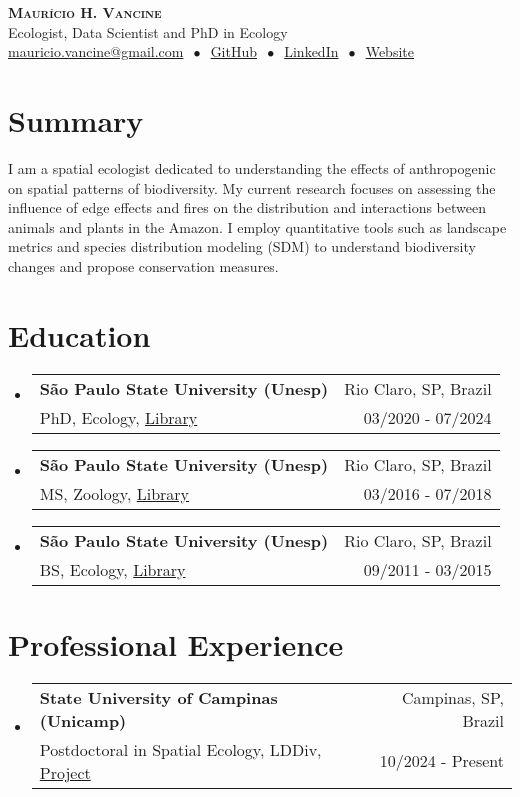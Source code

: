 \documentclass[letterpaper,11pt]{article}
\makeatletter
\newcommand{\cvheading}[4]{
  \vspace{-2pt}\item
    \begin{tabular*}{\textwidth}[t]{l@{\extracolsep{\fill}}r}
      \textbf{#1} & #2 \\
      \small#3 & \small #4 \\
    \end{tabular*}\vspace{-7pt}
}
\newcommand{\cvheadingstart}{\begin{itemize}[leftmargin=0in, label={}]}
\newcommand{\cvheadingend}{\end{itemize}}
\makeatother
\begin{document}
\begin{center}
  \textbf{\LARGE\scshape Maurício H. Vancine} \\
  \vspace{5pt}\small
  Ecologist, Data Scientist and PhD in Ecology\\
  \href{mailto:}{mauricio.vancine@gmail.com}
  $\ \bullet\ $ 
  \href{https://github.com/mauriciovancine}{GitHub}
  $\ \bullet\ $
  \href{https://www.linkedin.com/in/mauricio-vancine/}{LinkedIn}
    $\ \bullet\ $
  \href{https://mauriciovancine.github.io}{Website}
\end{center}

\section{Summary}
I am a spatial ecologist dedicated to understanding the effects of anthropogenic on spatial patterns of biodiversity. My current research focuses on assessing the influence of edge effects and fires on the distribution and interactions between animals and plants in the Amazon. I employ quantitative tools such as landscape metrics and species distribution modeling (SDM) to understand biodiversity changes and propose conservation measures.

\section{Education}
\cvheadingstart
  \cvheading
    {São Paulo State University (Unesp)}{Rio Claro, SP, Brazil}
    {PhD, Ecology, \href{https://hdl.handle.net/11449/256726}{Library}}{03/2020 - 07/2024}
  \cvheading
    {São Paulo State University (Unesp)}{Rio Claro, SP, Brazil}
    {MS, Zoology, \href{http://hdl.handle.net/11449/154993}{Library}}{03/2016 - 07/2018}
  \cvheading
    {São Paulo State University (Unesp)}{Rio Claro, SP, Brazil}
    {BS, Ecology, \href{http://hdl.handle.net/11449/138991}{Library}}{09/2011 - 03/2015}
\cvheadingend

\section{Professional Experience}
\cvheadingstart
  \cvheading
    {State University of Campinas (Unicamp)}{Campinas, SP, Brazil}
    {Postdoctoral in Spatial Ecology, LDDiv, \href{https://bv.fapesp.br/pt/auxilios/113861/interacoes-entre-plantas-e-animais-e-os-impactos-em-cascata-da-fragmentacao-da-floresta-amazonica/}{Project}}{10/2024 - Present}
\cvheadingend
\end{document}
